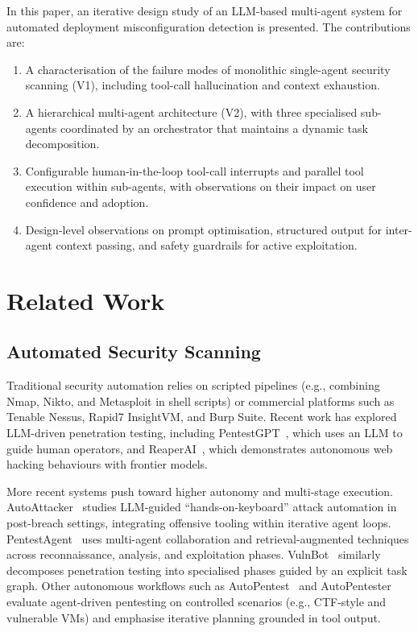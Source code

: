 \documentclass[sigconf,anonymous]{acmart}
\begin{document}
In this paper, an iterative design study of an LLM-based multi-agent system for automated deployment misconfiguration detection is presented. The contributions are:

\begin{enumerate}[leftmargin=*]
    \item A characterisation of the failure modes of monolithic single-agent security scanning (V1), including tool-call hallucination and context exhaustion.
    \item A hierarchical multi-agent architecture (V2), with three specialised sub-agents coordinated by an orchestrator that maintains a dynamic task decomposition.
    \item Configurable human-in-the-loop tool-call interrupts and parallel tool execution within sub-agents, with observations on their impact on user confidence and adoption.
    \item Design-level observations on prompt optimisation, structured output for inter-agent context passing, and safety guardrails for active exploitation.
\end{enumerate}

\section{Related Work}
\label{sec:related_work}

\subsection{Automated Security Scanning}

Traditional security automation relies on scripted pipelines (e.g., combining Nmap, Nikto, and Metasploit in shell scripts) or commercial platforms such as Tenable Nessus, Rapid7 InsightVM, and Burp Suite. Recent work has explored LLM-driven penetration testing, including PentestGPT~\cite{deng2023pentestgpt}, which uses an LLM to guide human operators, and ReaperAI~\cite{fang2024llmagents}, which demonstrates autonomous web hacking behaviours with frontier models.

More recent systems push toward higher autonomy and multi-stage execution. AutoAttacker~\cite{xu2024autoattacker} studies LLM-guided ``hands-on-keyboard'' attack automation in post-breach settings, integrating offensive tooling within iterative agent loops. PentestAgent~\cite{shen2024pentestagent} uses multi-agent collaboration and retrieval-augmented techniques across reconnaissance, analysis, and exploitation phases. VulnBot~\cite{kong2025vulnbot} similarly decomposes penetration testing into specialised phases guided by an explicit task graph. Other autonomous workflows such as AutoPentest~\cite{henke2025autopentest} and AutoPentester~\cite{ginige2025autopentester} evaluate agent-driven pentesting on controlled scenarios (e.g., CTF-style and vulnerable VMs) and emphasise iterative planning grounded in tool output.
\end{document}
